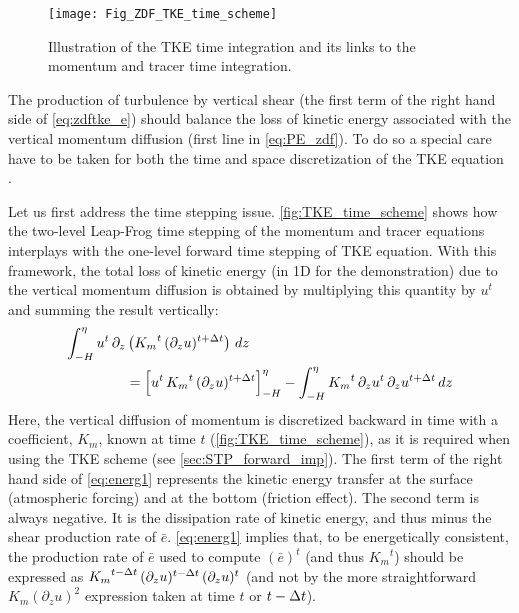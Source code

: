 \documentclass[../main/NEMO_manual]{subfiles}
\begin{document}
\begin{figure}[!t]
  \begin{center}
    \texttt{[image: Fig\_ZDF\_TKE\_time\_scheme]}
    \caption{
      \protect\label{fig:TKE_time_scheme}
      Illustration of the TKE time integration and its links to the momentum and tracer time integration.
    }
  \end{center}  
\end{figure}

The production of turbulence by vertical shear (the first term of the right hand side of
\autoref{eq:zdftke_e}) should balance the loss of kinetic energy associated with the vertical momentum diffusion
(first line in \autoref{eq:PE_zdf}).
To do so a special care have to be taken for both the time and space discretization of
the TKE equation \citep{Burchard_OM02,Marsaleix_al_OM08}.

Let us first address the time stepping issue. \autoref{fig:TKE_time_scheme} shows how
the two-level Leap-Frog time stepping of the momentum and tracer equations interplays with
the one-level forward time stepping of TKE equation.
With this framework, the total loss of kinetic energy (in 1D for the demonstration) due to
the vertical momentum diffusion is obtained by multiplying this quantity by $u^t$ and
summing the result vertically:   
\begin{equation}
  \label{eq:energ1}
  \begin{split}
    \int_{-H}^{\eta}  u^t \,\partial_z &\left( {K_m}^t \,(\partial_z u)^{t+\Delta t}  \right) \,dz   \\
    &= \Bigl[  u^t \,{K_m}^t \,(\partial_z u)^{t+\Delta t} \Bigr]_{-H}^{\eta}
    - \int_{-H}^{\eta}{ {K_m}^t \,\partial_z{u^t} \,\partial_z u^{t+\Delta t} \,dz }
  \end{split}
\end{equation}
Here, the vertical diffusion of momentum is discretized backward in time with a coefficient, $K_m$,
known at time $t$ (\autoref{fig:TKE_time_scheme}), as it is required when using the TKE scheme
(see \autoref{sec:STP_forward_imp}).
The first term of the right hand side of \autoref{eq:energ1} represents the kinetic energy transfer at
the surface (atmospheric forcing) and at the bottom (friction effect).
The second term is always negative.
It is the dissipation rate of kinetic energy, and thus minus the shear production rate of $\bar{e}$.
\autoref{eq:energ1} implies that, to be energetically consistent,
the production rate of $\bar{e}$ used to compute $(\bar{e})^t$ (and thus ${K_m}^t$) should be expressed as
${K_m}^{t-\Delta t}\,(\partial_z u)^{t-\Delta t} \,(\partial_z u)^t$
(and not by the more straightforward $K_m \left( \partial_z u \right)^2$ expression taken at time $t$ or $t-\Delta t$).
\end{document}
